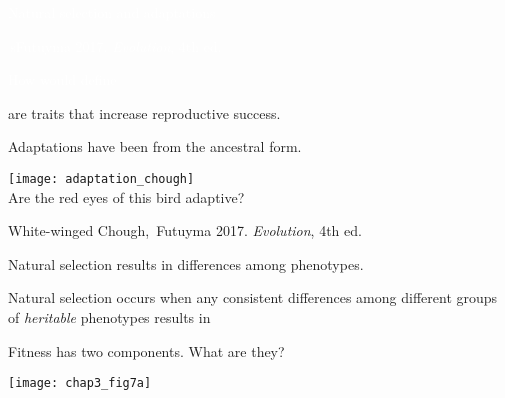 \documentclass[t]{beamer}
\begin{document}

{
	\begin{frame}[t]{\textcolor{white}{Natural selection and adaptations}}
	
	\vfilll
	
	\tiny\hfill \textcolor{white}{\textcopyright\,sFutuyma 2017. \textit{Evolution}, 4th ed.}
\end{frame}
}


{
	\begin{frame}[b,plain]{\textcolor{white}{How would define} }
	
	\vfilll
	
	\tiny \hfill {}
	
\end{frame}
}


\begin{frame}[t, plain]{ are traits that increase reproductive success.}

\vspace{-\baselineskip}

\hangpara Adaptations have been  from the ancestral form.\bigskip

\texttt{[image: adaptation\_chough]}\\
Are the red eyes of this bird adaptive?

\vfilll

\hfill \tiny White-winged Chough, \textcopyright\,Futuyma 2017. \textit{Evolution}, 4th ed.

\end{frame}


\begin{frame}[t,plain]{Natural selection results in  differences among phenotypes.}

\vspace{-\baselineskip}

\begin{multicols}{2}

\hangpara Natural selection occurs when any consistent differences among different groups of \emph{heritable} phenotypes results in 

\hangpara Fitness has two components. What are they?

\columnbreak

\texttt{[image: chap3\_fig7a]}

\end{multicols}
\end{frame}
\end{document}
